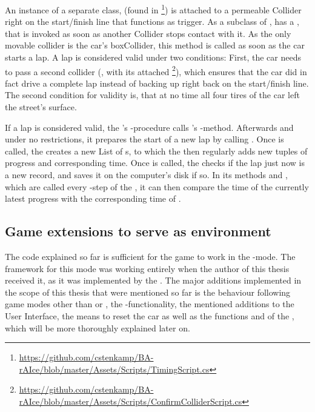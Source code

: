 An instance of a separate class,  (found in \footnote{\url{https://github.com/cstenkamp/BA-rAIce/blob/master/Assets/Scripts/TimingScript.cs}}) is attached to a permeable Collider right on the start/finish line that functions as trigger. As a subclass of ,  has a , that is invoked as soon as another Collider stops contact with it. As the only movable collider is the car's boxCollider, this method is called as soon as the car starts a lap. A lap is considered valid under two conditions: First, the car needs to pass a second collider (, with its attached \footnote{\url{https://github.com/cstenkamp/BA-rAIce/blob/master/Assets/Scripts/ConfirmColliderScript.cs}}), which ensures that the car did in fact drive a complete lap instead of backing up right back on the start/finish line. The second condition for validity is, that at no time all four tires of the car left the street's surface.

\noindent If a lap is considered valid, the 's -procedure calls 's -method. Afterwards and under no restrictions, it prepares the start of a new lap by calling . Once  is called, the  creates a new List of s, to which the  then regularly adds new tuples of progress and corresponding time. Once  is called, the  checks if the lap just now is a new record, and saves it on the computer's disk if so. In its methods  and , which are called every -step of the , it can then compare the time of the currently latest progress with the corresponding time of . \\

\subsection{Game extensions to serve as environment}
\label{ch:gamedescriptionmypart}

The code explained so far is sufficient for the game to work in the -mode. The framework for this mode was working entirely when the author of this thesis received it, as it was implemented by the \leonbase. The major additions implemented in the scope of this thesis that were mentioned so far is the behaviour following game modes other than  or , the -functionality, the mentioned additions to the User Interface, the means to reset the car as well as the functions  and  of the , which will be more thoroughly explained later on.

